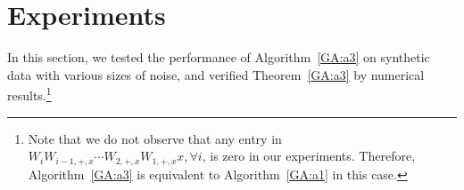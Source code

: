 %
%



%
%

\section{Experiments}


In this section, we tested the performance of Algorithm~\ref{GA:a3} on synthetic data with various sizes of noise, and verified Theorem~\ref{GA:a3} by numerical results.\footnote{Note that we do not observe that any entry in $W_i W_{i - 1, +, x} \cdots W_{2, +, x} W_{1, +, x} x, \forall i$, is zero in our experiments. Therefore, Algorithm~\ref{GA:a3} is equivalent to Algorithm~\ref{GA:a1} in this case.}

